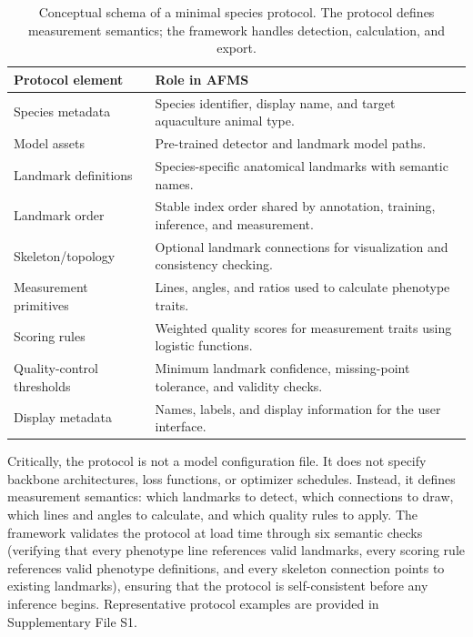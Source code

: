\documentclass[final,3p,times]{elsarticle}
\begin{document}
\begin{table}[htbp]
  \centering
  \caption{Conceptual schema of a minimal species protocol. The protocol defines measurement semantics; the framework handles detection, calculation, and export.}
  \label{tab:protocol_schema}
  \small
  \begin{tabular}{p{}p{}}
    \toprule
    Protocol element & Role in AFMS \\
    \midrule
    Species metadata & Species identifier, display name, and target aquaculture animal type. \\
    Model assets & Pre-trained detector and landmark model paths. \\
    Landmark definitions & Species-specific anatomical landmarks with semantic names. \\
    Landmark order & Stable index order shared by annotation, training, inference, and measurement. \\
    Skeleton/topology & Optional landmark connections for visualization and consistency checking. \\
    Measurement primitives & Lines, angles, and ratios used to calculate phenotype traits. \\
    Scoring rules & Weighted quality scores for measurement traits using logistic functions. \\
    Quality-control thresholds & Minimum landmark confidence, missing-point tolerance, and validity checks. \\
    Display metadata & Names, labels, and display information for the user interface. \\
    \bottomrule
  \end{tabular}
\end{table}

Critically, the protocol is not a model configuration file. It does not specify backbone architectures, loss functions, or optimizer schedules. Instead, it defines measurement semantics: which landmarks to detect, which connections to draw, which lines and angles to calculate, and which quality rules to apply. The framework validates the protocol at load time through six semantic checks (verifying that every phenotype line references valid landmarks, every scoring rule references valid phenotype definitions, and every skeleton connection points to existing landmarks), ensuring that the protocol is self-consistent before any inference begins. Representative protocol examples are provided in Supplementary File S1.
\end{document}
